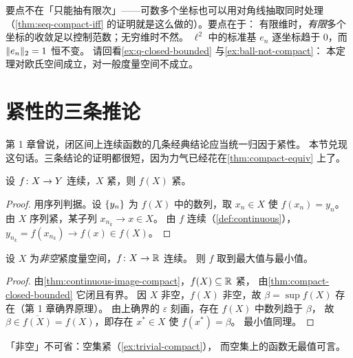 \begin{remark}
要点不在「只能抽有限次」——可数多个坐标也可以用对角线抽取同时处理
  （\cref{thm:seq-compact-iff} 的证明就是这么做的）。要点在于：
  有限维时，\emph{有限}多个坐标的收敛足以控制范数；无穷维时不然。
  \(\ell^{2}\) 中的标准基 \(e_{n}\) 逐坐标趋于 \(0\)，而 \(\lVert e_{n}\rVert_{2}=1\) 恒不变。
  请回看\cref{ex:q-closed-bounded} 与\cref{ex:ball-not-compact}：
  本定理对欧氏空间成立，对一般度量空间不成立。
\end{remark}

\section{紧性的三条推论}
\label{sec:consequences}

第 1 章曾说，闭区间上连续函数的几条经典结论应当统一归因于紧性。
本节兑现这句话。三条结论的证明都很短，因为力气已经花在\cref{thm:compact-equiv} 上了。

\begin{theorem}[连续像仍紧]
  \label{thm:continuous-image-compact}
  设 \(f \colon X \to Y\) 连续，\(X\) 紧，则 \(f(X)\) 紧。
\end{theorem}

\begin{proof}
  用序列判据。设 \(\{y_{n}\}\) 为 \(f(X)\) 中的数列，取 \(x_{n} \in X\) 使
  \(f(x_{n}) = y_{n}\)。由 \(X\) 序列紧，某子列 \(x_{n_{k}} \to x \in X\)。
  由 \(f\) 连续（\cref{def:continuous}），\(y_{n_{k}} = f(x_{n_{k}}) \to f(x) \in f(X)\)。
\end{proof}

\begin{theorem}[最值定理]
  \label{thm:extreme-value}
  设 \(X\) 为\emph{非空}紧度量空间，\(f \colon X \to \mathbb{R}\) 连续。
  则 \(f\) 取到最大值与最小值。
\end{theorem}

\begin{proof}
  由\cref{thm:continuous-image-compact}，\(f(X) \subseteq \mathbb{R}\) 紧，
  由\cref{thm:compact-closed-bounded} 它闭且有界。
  因 \(X\) 非空，\(f(X)\) 非空，故 \(\beta = \sup f(X)\) 存在（第 1 章确界原理）。
  由上确界的 \(\varepsilon\) 刻画，存在 \(f(X)\) 中数列趋于 \(\beta\)，
  故 \(\beta \in \overline{f(X)} = f(X)\)，即存在 \(x^{*} \in X\) 使 \(f(x^{*}) = \beta\)。
  最小值同理。
\end{proof}

\begin{remark}
  「非空」不可省：空集紧（\cref{ex:trivial-compact}），
  而空集上的函数无最值可言。
\end{remark}

